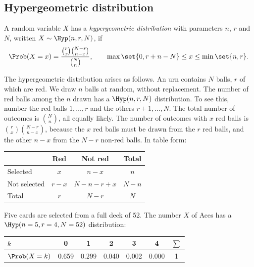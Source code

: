 \subsection{Hypergeometric distribution}\label{sec:hypergeometric}

\begin{definition}\label{def:hypergeometric}
A random variable $X$ has a \emph{hypergeometric distribution} with parameters $n$, $r$ and $N$, written $X \sim \Hyp(n, r, N)$, if
\[
  \Prob(X = x) = \frac{\binom{r}{x} \binom{N - r}{n - x}}{\binom{N}{n}}, \qquad \max\set{0, r + n - N} \le x \le \min\set{n, r}.
\]
\end{definition}

The hypergeometric distribution arises as follows. An urn contains $N$ balls, $r$ of which are red. We draw $n$ balls at random, without replacement. The number of red balls among the $n$ drawn has a $\Hyp(n, r, N)$ distribution. To see this, number the red balls $1, \ldots, r$ and the others $r + 1, \ldots, N$. The total number of outcomes is $\binom{N}{n}$, all equally likely. The number of outcomes with $x$ red balls is $\binom{r}{x} \binom{N - r}{n - x}$, because the $x$ red balls must be drawn from the $r$ red balls, and the other $n - x$ from the $N - r$ non-red balls. In table form:
\begin{center}
\begin{tabular}{@{}lccc@{}}
\toprule
 & Red & Not red & Total \\
\midrule
Selected & $x$ & $n - x$ & $n$ \\
Not selected & $r - x$ & $N - n - r + x$ & $N - n$ \\
Total & $r$ & $N - r$ & $N$ \\
\bottomrule
\end{tabular}
\end{center}

\begin{example}[Aces]\label{ex:hypergeometric-aces}
Five cards are selected from a full deck of 52. The number $X$ of Aces has a $\Hyp(n = 5, r = 4, N = 52)$ distribution:
\begin{center}
\begin{tabular}{@{}lcccccc@{}}
\toprule
$k$ & 0 & 1 & 2 & 3 & 4 & $\sum$ \\
\midrule
$\Prob(X = k)$ & 0.659 & 0.299 & 0.040 & 0.002 & 0.000 & 1 \\
\bottomrule
\end{tabular}
\end{center}
\end{example}

